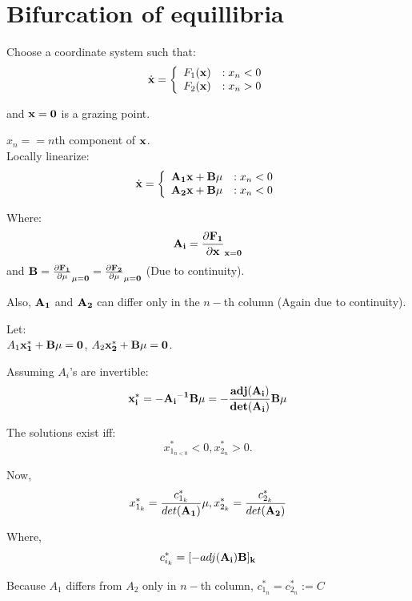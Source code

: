 \documentclass[xcolor=x11names,compress]{beamer}
\renewcommand{\(}{\begin{columns}}
\renewcommand{\)}{\end{columns}}
\newcommand{\<}[1]{\begin{column}{#1}}
\renewcommand{\>}{\end{column}}
\begin{document}
\section{Bifurcation of equillibria}

\begin{frame}
Choose a coordinate system such that:\\
\begin{displaymath}
   \dot{\bf{x}} = \left\{
     \begin{array}{lr}
       F_1(\bf{x}) & : x_n<0\\
       F_2(\bf{x}) & : x_n>0
     \end{array}
   \right.
\end{displaymath}

and $\bf{x}=0$ is a grazing point.  

$x_n==n$th component of $\bf{x}$.  \\

Locally linearize:
\begin{displaymath}
   \dot{\bf{x}} = \left\{
     \begin{array}{lr}
       \bf{A_1x+\bf{B}\mu} & : x_n<0\\
       \bf{A_2x+\bf{B}\mu} & : x_n<0\\
     \end{array}
   \right.
\end{displaymath}

Where:\\
\[
\bf{A_i}=\frac{\partial F_1}{\partial \bf{x}}_{x=0}
\]
and 
$\bf{B}=\frac{\partial F_1}{\partial \mu}_{\mu=0}=\frac{\partial F_2}{\partial \mu}_{\mu=0}$
 (Due to continuity).

Also, $\bf{A_1}$ and $\bf{A_2}$ can differ only in the $n-$th column (Again due to continuity).


\end{frame}


\begin{frame}
Let:\\
$A_1\bf{x}^*_1+\bf{B}\mu=0$,
$A_2\bf{x}^*_2+\bf{B}\mu=0$.  


Assuming $A_i$'s are invertible:
\[
\bf{x}^*_i=-\bf{A_i}^{-1}\bf{B}\mu=-\frac{adj(\bf{A_i})}{det(\bf{A_i})}\bf{B}\mu
\]

The solutions exist iff:
\[
x^*_{1_{n<0}}<0, x^*_{2{_n}}>0. 
\]  

Now, 
\[
x^*_{1_k}=\frac{c^*_{1_k}}{det(\bf{A_1})}\mu, x^*_{2_k}=\frac{c^*_{2_k}}{det(\bf{A_2})}
\]

Where, \[
c^*_{i_k}=[-adj(\bf{A_i)B}]_k
\]

Because $A_1$ differs from $A_2$ only in $n-$th column, $c^*_{1_n}=c^*_{2_n}:=C$

\end{frame}
\end{document}
